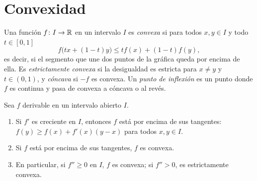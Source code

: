 \addtocounter{definicion}{1}%

\section{Convexidad}

\begin{definicion}\label{def:convexa}
Una función $f\colon I\to\mathbb{R}$ en un intervalo $I$ es \emph{convexa} si para todos $x,y\in I$ y todo $t\in[0,1]$
\[
f\bigl(tx+(1-t)y\bigr)\le tf(x)+(1-t)f(y),
\]
es decir, si el segmento que une dos puntos de la gráfica queda por encima de ella. Es \emph{estrictamente convexa} si la desigualdad es estricta para $x\ne y$ y $t\in(0,1)$, y \emph{cóncava} si $-f$ es convexa. Un \emph{punto de inflexión} es un punto donde $f$ es continua y pasa de convexa a cóncava o al revés.
\end{definicion}

\begin{teorema}\label{teo:convexidad}
Sea $f$ derivable en un intervalo abierto $I$.
\begin{enumerate}
  \item Si $f'$ es creciente en $I$, entonces $f$ está por encima de sus tangentes: $f(y)\ge f(x)+f'(x)(y-x)$ para todos $x,y\in I$.
  \item Si $f$ está por encima de sus tangentes, $f$ es convexa.
  \item En particular, si $f''\ge0$ en $I$, $f$ es convexa; si $f''>0$, es estrictamente convexa.
\end{enumerate}
\end{teorema}

\addtocounter{definicion}{1}%

\addtocounter{definicion}{1}%

\addtocounter{definicion}{1}%

